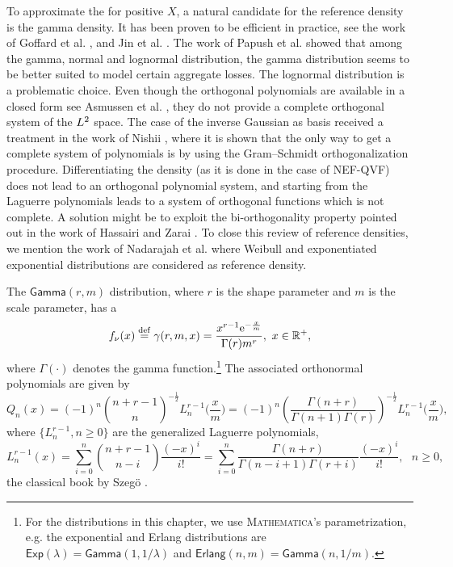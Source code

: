 To approximate the \pdf for positive $X$, a natural candidate for the reference density is the gamma density. It has been proven to be efficient in practice, see the work of Goffard et al. \cite{GoLoPo15,GoLoPo16}, and Jin et al. \cite{JiPrRe16}. The work of Papush et al. \cite{PaPaPo01} showed that among the gamma, normal and lognormal distribution, the gamma distribution seems to be better suited to model certain aggregate losses. The lognormal distribution is a problematic choice. Even though the orthogonal polynomials are available in a closed form see Asmussen et al. \cite{asmussen2016orthonormal}, they do not provide a complete orthogonal system of the $L^2$ space. The case of the inverse Gaussian as basis received a treatment in the work of Nishii \cite{Ni96}, where it is shown that the only way to get a complete system of polynomials is by using the Gram--Schmidt orthogonalization procedure. Differentiating the density (as it is done in the case of NEF-QVF) does not lead to an orthogonal polynomial system, and starting from the Laguerre polynomials leads to a system of orthogonal functions which is not complete. A solution might be to exploit the bi-orthogonality property pointed out in the work of Hassairi and Zarai \cite{HaZa04}. To close this review of reference densities, we mention the work of Nadarajah et al. \cite{NaChJi16} where Weibull and exponentiated exponential distributions are considered as reference density.

The $\mathsf{Gamma}(r,m)$ distribution, where $r$ is the shape parameter and $m$ is the scale parameter, has a \pdf
\begin{equation*}\label{eq:PDFGamma}
f_\nu(x)\overset{\mathrm{def}}{=}\gamma(r,m,x)=\frac{x^{r-1}\mathrm{e}^{-\frac{x}{m}}}{\Gamma(r)m^{r}},\text{ }x\in\mathbb{R}^{+},
\end{equation*}
where $\Gamma(\cdot)$ denotes the gamma function.\footnote{For the distributions in this chapter, we use \textsc{Mathematica}'s parametrization, e.g. the exponential and Erlang distributions are $\mathsf{Exp}(\lambda) = \mathsf{Gamma}(1, 1/\lambda)$ and $\mathsf{Erlang}(n, m) = \mathsf{Gamma}(n, 1/m)$.}
The associated orthonormal polynomials are given by
\begin{equation*}\label{eq:GeneralizedLaguerrePolynomials}
Q_{n}(x)
=(-1)^{n} \binom{n + r - 1}{n}^{-\frac12} L_{n}^{r-1}\big(\frac{x}{m}\big)
=(-1)^{n} \left( \frac{\Gamma(n+r)}{\Gamma(n+1)\Gamma(r)} \right)^{-\frac12} L_{n}^{r-1}\big(\frac{x}{m}\big),
\end{equation*}
where $\{L_{n}^{r-1},n\geq0\}$ are the generalized Laguerre polynomials,
\begin{equation*}\label{eq:GeneralizedLaguerrePolynomialsExpression}
L_{n}^{r-1}(x)
=\sum_{i=0}^{n} \binom{n + r - 1}{n - i} \frac{(-x)^i}{i!}
=\sum_{i=0}^{n} \frac{\Gamma(n+r)}{\Gamma(n-i+1)\Gamma(r+i)}\frac{(-x)^i}{i!}, \text{ }n\geq 0,
\end{equation*}
\cf the classical book by Szeg{\"o} \cite{Szegoe1939}. %

